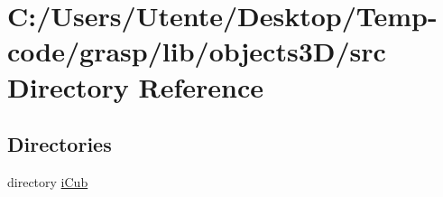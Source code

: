 \section{C\+:/\+Users/\+Utente/\+Desktop/\+Temp-\/code/grasp/lib/objects3\+D/src Directory Reference}
\label{dir_58eafd9c5448b11a3dac027a0f0a8faf}
\subsection*{Directories}
\begin{DoxyCompactItemize}
\item 
directory \hyperlink{dir_fad77f832006d3d52c3c8fd0948a1b45}{i\+Cub}
\end{DoxyCompactItemize}
